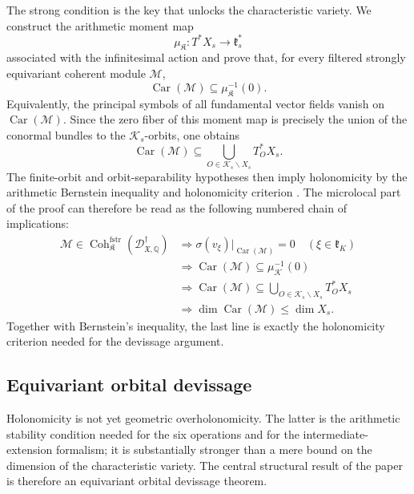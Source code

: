 \documentclass[11pt]{amsart}
\theoremstyle{plain}
\theoremstyle{definition}
\theoremstyle{remark}
\newcommand{\X}{\mathfrak X}
\newcommand{\DdagX}{\mathscr D^{\dagger}_{\X,\mathbb Q}}
\newcommand{\Coh}{\operatorname{Coh}}
\newcommand{\Car}{\operatorname{Car}}
\newcommand{\fstr}{\mathrm{fstr}}
\begin{document}
The strong condition is the key that unlocks the characteristic variety.  We
construct the arithmetic moment map
\[
  \mu_{\mathfrak K}:T^*X_s\longrightarrow \mathfrak k_s^*
\]
associated with the infinitesimal action and prove that, for every filtered strongly
equivariant coherent module \(\mathcal M\),
\[
  \operatorname{Car}(\mathcal M)
  \subseteq
  \mu_{\mathfrak K}^{-1}(0).
\]
Equivalently, the principal symbols of all fundamental vector fields vanish on
\(\operatorname{Car}(\mathcal M)\).  Since the zero fiber of this moment map is
precisely the union of the conormal bundles to the \(\mathcal K_s\)-orbits, one
obtains
\[
  \operatorname{Car}(\mathcal M)
  \subseteq
  \bigcup_{O\in\mathcal K_s\backslash X_s}T_O^*X_s.
\]
The finite-orbit and orbit-separability hypotheses then imply holonomicity by the arithmetic
Bernstein inequality and holonomicity criterion \cite[Th\'eor\`emes 2.2.3 and 2.2.8]{CaroHolonomieSansFrobenius}.
The microlocal part of the proof can therefore be read as the following
numbered chain of implications:
\begin{equation}
\label{eq:intro-microlocal-chain}
\begin{aligned}
  \mathcal M\in\Coh^{\fstr}_{\mathfrak K}(\DdagX)
  &\Longrightarrow
  \sigma(v_\xi)|_{\Car(\mathcal M)}=0
  \quad (\xi\in\mathfrak k_K) \\
  &\Longrightarrow
  \Car(\mathcal M)\subseteq\mu_{\mathcal K}^{-1}(0) \\
  &\Longrightarrow
  \Car(\mathcal M)\subseteq
  \bigcup_{O\in\mathcal K_s\backslash X_s}T^*_O X_s \\
  &\Longrightarrow
  \dim\Car(\mathcal M)\leq\dim X_s.
\end{aligned}
\end{equation}
Together with Bernstein's inequality, the last line is exactly the
holonomicity criterion needed for the devissage argument.

\subsection*{Equivariant orbital devissage}

Holonomicity is not yet geometric overholonomicity.  The latter is the
arithmetic stability condition needed for the six operations and for the
intermediate-extension formalism; it is substantially stronger than a mere
bound on the dimension of the characteristic variety.  The central structural
result of the paper is therefore an equivariant orbital devissage theorem.
\end{document}

